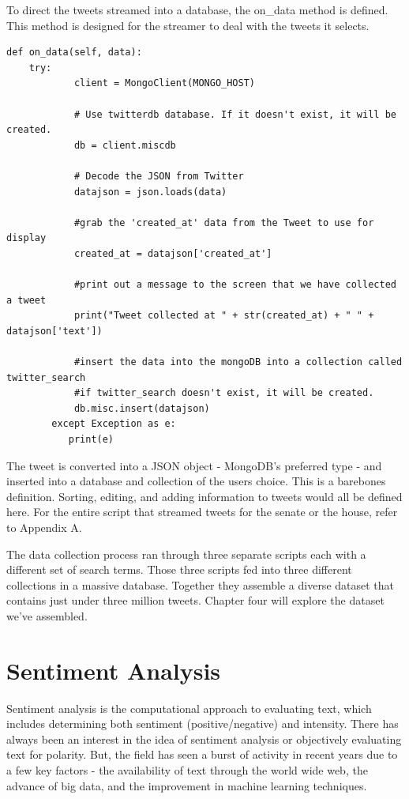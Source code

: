 \documentclass[11pt, twoside, reqno]{book}
\begin{document}
To direct the tweets streamed into a database, the on\_data method is defined. This method is designed for the streamer to deal with the tweets it selects.

\begin{verbatim}
def on_data(self, data):
	try:
            client = MongoClient(MONGO_HOST)

            # Use twitterdb database. If it doesn't exist, it will be created.
            db = client.miscdb

            # Decode the JSON from Twitter
            datajson = json.loads(data)

            #grab the 'created_at' data from the Tweet to use for display
            created_at = datajson['created_at']

            #print out a message to the screen that we have collected a tweet
            print("Tweet collected at " + str(created_at) + " " + datajson['text'])

            #insert the data into the mongoDB into a collection called twitter_search
            #if twitter_search doesn't exist, it will be created.
            db.misc.insert(datajson)
        except Exception as e:
           print(e)
\end{verbatim}

The tweet is converted into a JSON object - MongoDB's preferred type - and inserted into a database and collection of the users choice. This is a barebones definition. Sorting, editing, and adding information to tweets would all be defined here. For the entire script that streamed tweets for the senate or the house, refer to Appendix A.

The data collection process ran through three separate scripts each with a different set of search terms. Those three scripts fed into three different collections in a massive database. Together they assemble a diverse dataset that contains just under three million tweets. Chapter four will explore the dataset we've assembled. 

\chapter{Sentiment Analysis}
\label{ch:3}
\hspace{0.2in}Sentiment analysis is the computational approach to evaluating text, which includes determining both sentiment (positive/negative) and intensity. There has always been an interest in the idea of sentiment analysis or objectively evaluating text for polarity. But, the field has seen a burst of activity in recent years due to a few key factors - the availability of text through the world wide web, the advance of big data, and the improvement in machine learning techniques. 
\end{document}
